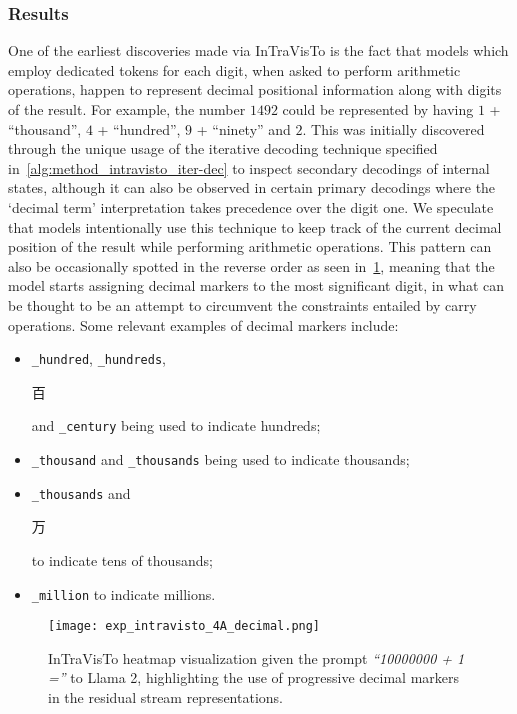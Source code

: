 \subsubsection{Results}

One of the earliest discoveries made via InTraVisTo is the fact that models which employ dedicated tokens for each digit, when asked to perform arithmetic operations, happen to represent decimal positional information along with digits of the result.
For example, the number $1492$ could be represented by having $1$ + ``thousand'', $4$ + ``hundred'', $9$ + ``ninety'' and $2$.
This was initially discovered through the unique usage of the iterative decoding technique specified in~\cref{alg:method_intravisto_iter-dec} to inspect secondary decodings of internal states, although it can also be observed in certain primary decodings where the `decimal term' interpretation takes precedence over the digit one.
We speculate that models intentionally use this technique to keep track of the current decimal position of the result while performing arithmetic operations.
This pattern can also be occasionally spotted in the reverse order as seen in~\cref{fig:exp_intravisto_4_A}, meaning that the model starts assigning decimal markers to the most significant digit, in what can be thought to be an attempt to circumvent the constraints entailed by carry operations.
Some relevant examples of decimal markers include:
\begin{itemize}
    \item \texttt{\_hundred}, \texttt{\_hundreds}, \begin{CJK}{UTF8}{goth}百\end{CJK} and \texttt{\_century} being used to indicate hundreds;
    \item \texttt{\_thousand} and \texttt{\_thousands} being used to indicate thousands;
    \item \texttt{\_thousands} and \begin{CJK}{UTF8}{goth}万\end{CJK} to indicate tens of thousands;
    \item \texttt{\_million} to indicate millions.
\end{itemize}

\begin{figure}[t!]
    \centering
    \texttt{[image: exp\_intravisto\_4A\_decimal.png]}
    \caption[InTraVisTo heatmap visualization given the prompt \emph{``10000000 + 1 =''} to Llama 2.]{InTraVisTo heatmap visualization given the prompt \emph{``10000000 + 1 =''} to Llama 2, highlighting the use of progressive decimal markers in the residual stream representations.}
    \label{fig:exp_intravisto_4_A}
\end{figure}

